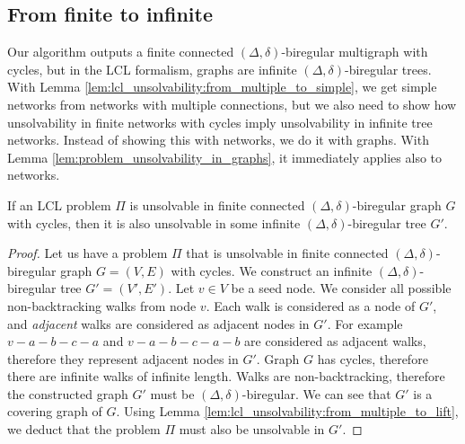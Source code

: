\subsection{From finite to infinite} \label{sec:algorithm:from_finite_to_infinite}
Our algorithm outputs a finite connected $(\Delta, \delta)$-biregular multigraph with cycles, but in the LCL formalism, graphs are infinite $(\Delta, \delta)$-biregular trees.
With Lemma \ref{lem:lcl_unsolvability:from_multiple_to_simple}, we get simple networks from networks with multiple connections, but we also need to show how unsolvability in finite networks with cycles imply unsolvability in infinite tree networks.
Instead of showing this with networks, we do it with graphs.
With Lemma \ref{lem:problem_unsolvability_in_graphs}, it immediately applies also to networks.

\begin{lemma} \label{lem:from_finite_to_infinite}
    If an LCL problem $\Pi$ is unsolvable in finite connected $(\Delta, \delta)$-biregular graph $G$ with cycles, then it is also unsolvable in some infinite $(\Delta, \delta)$-biregular tree $G'$.
\end{lemma}
\begin{proof}
    Let us have a problem $\Pi$ that is unsolvable in finite connected $(\Delta, \delta)$-biregular graph $G=(V, E)$ with cycles.
    We construct an infinite $(\Delta, \delta)$-biregular tree $G'=(V', E')$.
    Let $v \in V$ be a seed node.
    We consider all possible non-backtracking walks from node $v$.
    Each walk is considered as a node of $G'$, and \emph{adjacent} walks are considered as adjacent nodes in $G'$.
    For example $v-a-b-c-a$ and $v-a-b-c-a-b$ are considered as adjacent walks, therefore they represent adjacent nodes in $G'$.
    Graph $G$ has cycles, therefore there are infinite walks of infinite length.
    Walks are non-backtracking, therefore the constructed graph $G'$ must be $(\Delta, \delta)$-biregular.
    We can see that $G'$ is a covering graph of $G$.
    Using Lemma \ref{lem:lcl_unsolvability:from_multiple_to_lift}, we deduct that the problem $\Pi$ must also be unsolvable in $G'$.
\end{proof}


